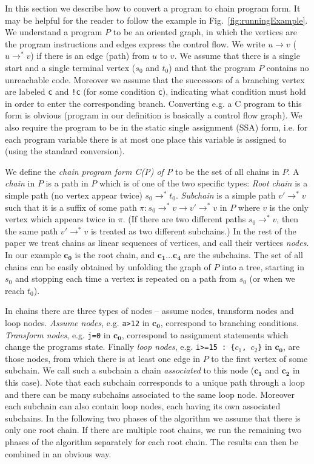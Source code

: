 \documentclass{llncs}
\begin{document}
In this section we describe how to convert a program to chain program
form. It may be helpful for the reader to follow the example in
Fig.~\ref{fig:runningExample}.  We understand a program $P$ to be an
oriented graph, in which the vertices are the program instructions and edges
express the control flow. We write $u\to v$ ($u\to^* v$) if there is an edge
(path) from $u$ to $v$. We assume that there is a single start and a single
terminal vertex ($s_0$ and $t_0$) and that the program $P$ contains no
unreachable code. Moreover we assume that the successors of a branching
vertex are labeled \texttt{c} and \texttt{!c} (for some condition
\texttt{c}), indicating what condition must hold in order to enter the
corresponding branch.  Converting e.g. a C program to this form is obvious
(program in our definition is basically a control flow graph). We also
require the program to be in the static single assignment (SSA) form,
i.e. for each program variable there is at most one place this variable is assigned to
(using the standard conversion).

We define the \emph{chain program form C(P) of P} to be the set of all
chains in $P$.  A \emph{chain} in $P$ is a path in $P$ which is of one of
the two specific types: \emph{Root chain} is a simple path (no vertex appear
twice) $s_0\to^* t_0$. \emph{Subchain} is a simple path $v'\to^* v$ such
that it is a suffix of some path $\pi: s_0\to^*v\to v'\to^*v$ 
in $P$ where $v$ is the only vertex which appears
twice in $\pi$.  (If there are two different paths $s_0\to^* v$, then the
same path $v'\to^* v$ is treated as two different subchains.)
In the rest of the paper we treat chains as linear sequences of
vertices, and call their vertices \emph{nodes}.
In our example $\mathbf{c_0}$ is the root chain, and
$\mathbf{c_1}\ldots\mathbf{c_4}$ are the subchains.
The set of all chains can be easily obtained by unfolding the graph of $P$ 
into a tree, starting in $s_0$ and stopping each time a vertex is repeated
on a path from $s_0$ (or when we reach $t_0$).

 
In chains there are three types of nodes -- assume nodes, transform nodes and
loop nodes. \emph{Assume nodes}, e.g. \texttt{a>12} in $\mathbf{c_0}$, correspond to branching
conditions. \emph{Transform nodes}, e.g. \texttt{j=0} in $\mathbf{c_0}$,
correspond to assignment statements which change the programs state. Finally
\emph{loop nodes}, e.g. \texttt{i>=15 : \{$c_1$, $c_2$\}} in $\mathbf{c_0}$, are those nodes, from
which there is at least one edge in $P$ to the first vertex of some subchain. We call such a
subchain a chain \emph{associated} to this node ($\mathbf{c_1}$ and
$\mathbf{c_2}$ in this case). Note that
each subchain corresponds to a unique path through a loop and there can be
many subchains associated to the same loop node. Moreover each subchain can
also contain loop nodes, each having its own associated subchains. In
the following two phases of the algorithm we assume that there is only one
root chain. If there are multiple root chains, we run the remaining two
phases of the algorithm separately for each root chain. The results can then
be combined in an obvious way. 
\end{document}
